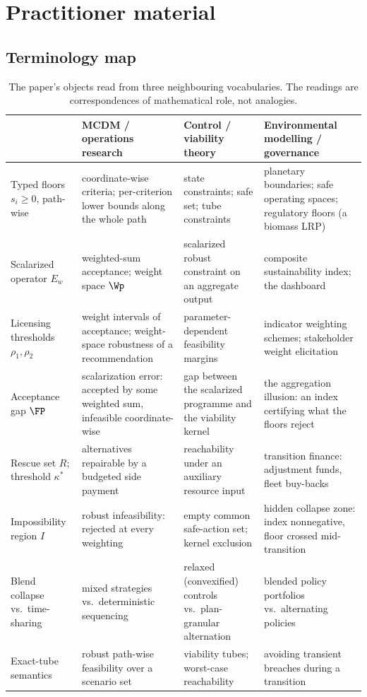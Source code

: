 \section{Practitioner material}\label{si:practice}

\subsection{Terminology map}

\begin{table}[!htbp]
\centering\small
\caption{The paper's objects read from three neighbouring vocabularies. The readings are correspondences of mathematical role, not analogies.}
\label{tab:translation}
\begin{tabularx}{\textwidth}{@{}>{\raggedright\arraybackslash}p{}>{\raggedright\arraybackslash}X>{\raggedright\arraybackslash}X>{\raggedright\arraybackslash}X@{}}
\toprule
 & MCDM / operations research & Control / viability theory & Environmental modelling / governance \\
\midrule
Typed floors $s_i\ge0$, path-wise & coordinate-wise criteria; per-criterion lower bounds along the whole path & state constraints; safe set; tube constraints & planetary boundaries; safe operating spaces; regulatory floors (a biomass LRP) \\
\addlinespace
Scalarized operator $E_w$ & weighted-sum acceptance; weight space $\Wp$ & scalarized robust constraint on an aggregate output & composite sustainability index; the dashboard \\
\addlinespace
Licensing thresholds $\rho_1,\rho_2$ & weight intervals of acceptance; weight-space robustness of a recommendation & parameter-dependent feasibility margins & indicator weighting schemes; stakeholder weight elicitation \\
\addlinespace
Acceptance gap $\FP$ & scalarization error: accepted by some weighted sum, infeasible coordinate-wise & gap between the scalarized programme and the viability kernel & the aggregation illusion: an index certifying what the floors reject \\
\addlinespace
Rescue set $R$; threshold $\kappa^*$ & alternatives repairable by a budgeted side payment & reachability under an auxiliary resource input & transition finance: adjustment funds, fleet buy-backs \\
\addlinespace
Impossibility region $I$ & robust infeasibility: rejected at every weighting & empty common safe-action set; kernel exclusion & hidden collapse zone: index nonnegative, floor crossed mid-transition \\
\addlinespace
Blend collapse vs.\ time-sharing & mixed strategies vs.\ deterministic sequencing & relaxed (convexified) controls vs.\ plan-granular alternation & blended policy portfolios vs.\ alternating policies \\
\addlinespace
Exact-tube semantics & robust path-wise feasibility over a scenario set & viability tubes; worst-case reachability & avoiding transient breaches during a transition \\
\bottomrule
\end{tabularx}
\end{table}

